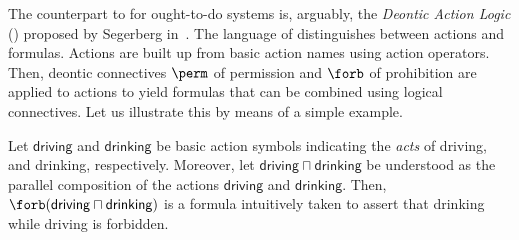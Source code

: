 The counterpart to \SDL for ought-to-do systems is, arguably, the \emph{Deontic Action Logic} (\DAL) proposed by Segerberg in~\cite{Segerberg1982}.
The language of \DAL distinguishes between actions and formulas. Actions are built up from basic action names using action operators.
Then, deontic connectives $\perm$ of permission and $\forb$ of prohibition are applied to actions to yield formulas that can be combined using logical connectives.
Let us illustrate this by means of a simple example.  

\medskip

\begin{example}
Let $\mathsf{driving}$ and $\mathsf{drinking}$ be basic action symbols indicating the \emph{acts} of driving, and drinking, respectively.
Moreover, let $\mathsf{driving} \sqcap \mathsf{drinking}$ be understood as the parallel composition of the actions $\mathsf{driving}$ and $\mathsf{drinking}$.
Then, $\forb(\mathsf{driving} \sqcap \mathsf{drinking})$ is a formula intuitively taken to assert
that drinking while driving is forbidden. %
\end{example}

\medskip

